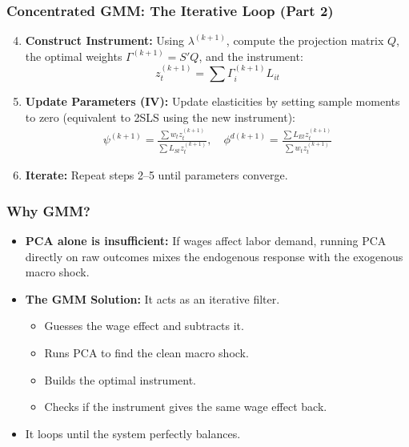\documentclass[aspectratio=169,11pt]{beamer}
\begin{document}
\begin{frame}
    \frametitle{Concentrated GMM: The Iterative Loop (Part 2)}
    
    \vspace{0.5cm}
    \begin{enumerate}
        \setcounter{enumi}{3}
        \item \textbf{Construct Instrument:} Using $\lambda^{(k+1)}$, compute the projection matrix $Q$, the optimal weights $\Gamma^{(k+1)} = S'Q$, and the instrument:
        \begin{equation*}
            z_t^{(k+1)} = \sum \Gamma_i^{(k+1)} L_{it}
        \end{equation*}
        
        \vspace{0.3cm}
        \item \textbf{Update Parameters (IV):} Update elasticities by setting sample moments to zero (equivalent to 2SLS using the new instrument):
        \begin{align*}
            \psi^{(k+1)} = \frac{\sum w_t z_t^{(k+1)}}{\sum L_{St} z_t^{(k+1)}}, \quad \phi^{d(k+1)} = \frac{\sum L_{Et} z_t^{(k+1)}}{\sum w_t z_t^{(k+1)}}
        \end{align*}
        
        \vspace{0.3cm}
        \item \textbf{Iterate:} Repeat steps 2--5 until parameters converge.
    \end{enumerate}
\end{frame}

\begin{frame}
    \frametitle{Why GMM?}
    
    \vspace{1cm}
    \begin{itemize}
        \item \textbf{PCA alone is insufficient:} If wages affect labor demand, running PCA directly on raw outcomes mixes the endogenous response with the exogenous macro shock.
        \item \textbf{The GMM Solution:} It acts as an iterative filter.
        \begin{itemize}
            \item Guesses the wage effect and subtracts it.
            \item Runs PCA to find the clean macro shock.
            \item Builds the optimal instrument.
            \item Checks if the instrument gives the same wage effect back.
        \end{itemize}
        \item It loops until the system perfectly balances.
    \end{itemize}
\end{frame}
\end{document}
